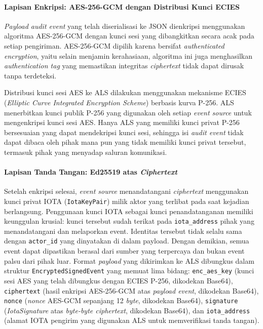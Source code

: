 \paragraph{Lapisan Enkripsi: AES-256-GCM dengan Distribusi Kunci ECIES}

\textit{Payload audit event} yang telah diserialisasi ke JSON dienkripsi menggunakan algoritma AES-256-GCM dengan kunci sesi yang dibangkitkan secara acak pada setiap pengiriman. AES-256-GCM dipilih karena bersifat \textit{authenticated encryption}, yaitu selain menjamin kerahasiaan, algoritma ini juga menghasilkan \textit{authentication tag} yang memastikan integritas \textit{ciphertext} tidak dapat dirusak tanpa terdeteksi.

Distribusi kunci sesi AES ke ALS dilakukan menggunakan mekanisme ECIES (\textit{Elliptic Curve Integrated Encryption Scheme}) berbasis kurva P-256. ALS menerbitkan kunci publik P-256 yang digunakan oleh setiap \textit{event source} untuk mengenkripsi kunci sesi AES. Hanya ALS yang memiliki kunci privat P-256 bersesuaian yang dapat mendekripsi kunci sesi, sehingga isi \textit{audit event} tidak dapat dibaca oleh pihak mana pun yang tidak memiliki kunci privat tersebut, termasuk pihak yang menyadap saluran komunikasi.

\paragraph{Lapisan Tanda Tangan: Ed25519 atas \textit{Ciphertext}}

Setelah enkripsi selesai, \textit{event source} menandatangani \textit{ciphertext} menggunakan kunci privat IOTA (\texttt{IotaKeyPair}) milik aktor yang terlibat pada saat kejadian berlangsung. Penggunaan kunci IOTA sebagai kunci penandatanganan memiliki keunggulan krusial: kunci tersebut sudah terikat pada \texttt{iota\_address} pihak yang menandatangani dan melaporkan event. Identitas tersebut tidak selalu sama dengan \texttt{actor\_id} yang dinyatakan di dalam payload. Dengan demikian, semua event dapat dipastikan berasal dari sumber yang terpercaya dan bukan event palsu dari pihak luar. Format \textit{payload} yang dikirimkan ke ALS dibungkus dalam struktur
\texttt{EncryptedSignedEvent} yang memuat lima bidang: \texttt{enc\_aes\_key}
(kunci sesi AES yang telah dibungkus dengan ECIES P-256, dikodekan Base64),
\texttt{ciphertext} (hasil enkripsi AES-256-GCM atas \textit{payload event},
dikodekan Base64), \texttt{nonce} (\textit{nonce} AES-GCM sepanjang 12
\textit{byte}, dikodekan Base64), \texttt{signature} (\textit{IotaSignature}
atas \textit{byte-byte ciphertext}, dikodekan Base64), dan \texttt{iota\_address}
(alamat IOTA pengirim yang digunakan ALS untuk memverifikasi tanda tangan).


